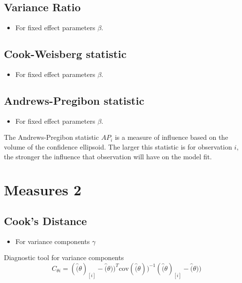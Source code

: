 \documentclass[Main.tex]{subfiles}
\begin{document}
	\subsection{Variance Ratio} %
	\begin{itemize}
		\item For fixed effect parameters $\beta$.
	\end{itemize}
	
	\subsection{Cook-Weisberg statistic} %
	\begin{itemize}
		\item For fixed effect parameters $\beta$.
	\end{itemize}
	

	\subsection{Andrews-Pregibon statistic} %
		\begin{itemize}
			\item For fixed effect parameters $\beta$.
		\end{itemize}
		The Andrews-Pregibon statistic $AP_{i}$ is a measure of influence based on the volume of the confidence ellipsoid.
		The larger this statistic is for observation $i$, the stronger the influence that observation will have on the model fit.

		
	\newpage
	\section{Measures 2} %
	
	
	\subsection{Cook's Distance} %
	\begin{itemize}
		\item For variance components $\gamma$
	\end{itemize}
	
	
	Diagnostic tool for variance components
	\[ C_{\theta i} =(\hat(\theta)_{[i]} - \hat(\theta))^{T}\mbox{cov}( \hat(\theta))^{-1}(\hat(\theta)_{[i]} - \hat(\theta))\]
	
	
	
	
\end{document}
